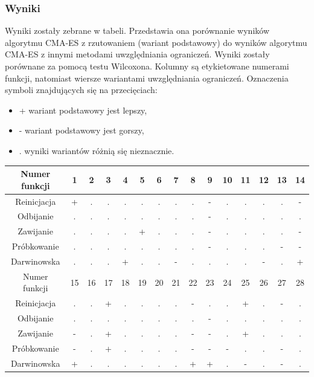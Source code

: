 \documentclass{mini}
\begin{document}
\subsubsection *{Wyniki}
Wyniki zostały zebrane w tabeli. Przedstawia ona porównanie wyników algorytmu CMA-ES z rzutowaniem (wariant podstawowy) do wyników algorytmu CMA-ES z innymi metodami uwzględniania ograniczeń. Wyniki zostały porównane za pomocą testu Wilcoxona. Kolumny są etykietowane numerami funkcji, natomiast wiersze wariantami uwzględniania ograniczeń. Oznaczenia symboli znajdujących się na przecięciach:
\begin{itemize}[noitemsep]
\item + wariant podstawowy jest lepszy,
\item - wariant podstawowy jest gorszy,
\item . wyniki wariantów różnią się nieznacznie.
\end{itemize}

\begin{tabular}{|c|c|c|c|c|c|c|c|c|c|c|c|c|c|c|} \hline
Numer funkcji & 1 & 2 & 3 & 4 & 5 & 6 & 7 & 8 & 9 & 10 & 11 & 12 & 13 & 14 \\ \hline
Reinicjacja & + & . & . & . & . & . & . & . & - & . & . & . & . & - \\ \hline
Odbijanie & . & . & . & . & . & . & . & . & - & . & . & . & . & . \\ \hline
Zawijanie & . & . & . & . & + & . & . & . & - & . & . & . & . & - \\ \hline
Próbkowanie & . & . & . & . & . & . & . & . & - & . & . & . & - & - \\ \hline
Darwinowska & . & . & . & + & . & . & - & . & . & . & . & - & . & + \\ \hline \hline
Numer funkcji & 15 & 16 & 17 & 18 & 19 & 20 & 21 & 22 & 23 & 24 & 25 & 26 & 27 & 28 \\ \hline
Reinicjacja & . & . & + & . & . & . & . & - & . & . & + & . & - & . \\ \hline
Odbijanie & . & . & . & . & . & . & . & . & - & . & . & . & . & . \\ \hline
Zawijanie & - & . & + & . & . & . & . & - & - & . & + & . & . & . \\ \hline
Próbkowanie & - & . & + & . & . & . & . & - & - & - & . & . & - & . \\ \hline
Darwinowska & + & . & . & . & . & . & . & + & + & . & - & . & - & . \\ \hline
\end{tabular} \\ \\
\end{document}

